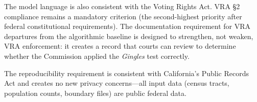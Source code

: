 The model language is also consistent with the Voting Rights Act. VRA \S2 compliance remains a mandatory criterion (the second-highest priority after federal constitutional requirements). The documentation requirement for VRA departures from the algorithmic baseline is designed to strengthen, not weaken, VRA enforcement: it creates a record that courts can review to determine whether the Commission applied the \textit{Gingles} test correctly.

The reproducibility requirement is consistent with California's Public Records Act and creates no new privacy concerns---all input data (census tracts, population counts, boundary files) are public federal data.
